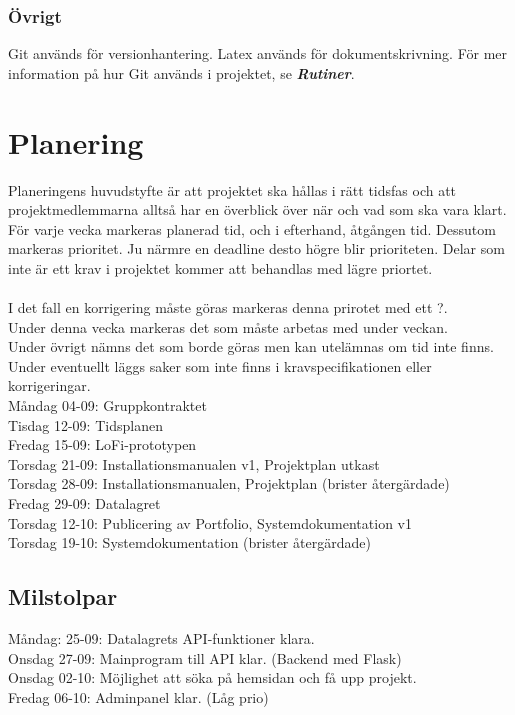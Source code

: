 \documentclass{TDP003mall}
\begin{document}
\subsubsection{Övrigt}
Git används för versionhantering. Latex används för dokumentskrivning. För mer information
på hur Git används i projektet, se \textbf{\textit{Rutiner}}.

\vspace{16em}

\section{Planering}
Planeringens huvudstyfte är att projektet ska hållas i rätt tidsfas och att projektmedlemmarna alltså har en överblick över när och vad som ska vara klart.
För varje vecka markeras planerad tid, och i efterhand, åtgången tid. Dessutom markeras prioritet. Ju närmre en deadline desto högre blir prioriteten.
Delar som inte är ett krav i projektet kommer att behandlas med lägre priortet.\\\\
I det fall en korrigering måste göras markeras denna prirotet med ett ?. \\
Under denna vecka markeras det som måste arbetas med under veckan.\\
Under övrigt nämns det som borde göras men kan utelämnas om tid inte finns.\\
Under eventuellt läggs saker som inte finns i kravspecifikationen eller korrigeringar. \\


Måndag 04-09: Gruppkontraktet\\
Tisdag 12-09: Tidsplanen\\
Fredag 15-09: LoFi-prototypen\\
Torsdag 21-09: Installationsmanualen v1, Projektplan utkast\\
Torsdag 28-09: Installationsmanualen, Projektplan (brister återgärdade)\\
Fredag 29-09: Datalagret\\
Torsdag 12-10: Publicering av Portfolio, Systemdokumentation v1\\
Torsdag 19-10: Systemdokumentation (brister återgärdade)\\

\subsection{Milstolpar}
Måndag: 25-09: Datalagrets API-funktioner klara.\\
Onsdag 27-09: Mainprogram till API klar. (Backend med Flask)\\
Onsdag 02-10: Möjlighet att söka på hemsidan och få upp projekt.\\
Fredag 06-10: Adminpanel klar. (Låg prio)\\
\end{document}
